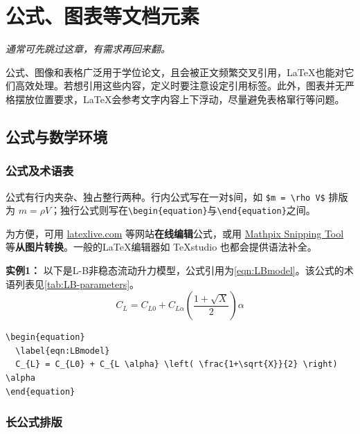 \chapter{公式、图表等文档元素}
\label{chap:example}

\textit{
通常可先跳过这章，有需求再回来翻。
}

公式、图像和表格广泛用于学位论文，且会被正文频繁交叉引用，\LaTeX{}也能对它们高效处理。若想引用这些内容，定义时要注意设定引用标签。此外，图表并无严格摆放位置要求，\LaTeX{}会参考文字内容上下浮动，尽量避免表格窜行等问题。

\section{公式与数学环境}

\subsection{公式及术语表}
\label{sec:eqn}

公式有行内夹杂、独占整行两种。行内公式写在一对\verb|$|间，如 \verb|$m = \rho V$| 排版为 $m = \rho V$；独行公式则写在\verb|\begin{equation}|与\verb|\end{equation}|之间。

为方便，可用 \href{https://www.latexlive.com/}{latexlive.com} 等网站\textbf{在线编辑}公式，或用 \href{https://mathpix.com/snipping-tool}{Mathpix Snipping Tool} 等\textbf{从图片转换}。一般的\LaTeX{}编辑器如 TeXstudio 也都会提供语法补全。

{\bf{实例1：}} 以下是L-B非稳态流动升力模型，公式引用为\autoref{eqn:LBmodel}。该公式的术语列表见\autoref{tab:LB-parameters}。
\begin{equation}
  \label{eqn:LBmodel}
  C_{L} = C_{L0} + C_{L \alpha} \left( \frac{1+\sqrt{X}}{2} \right) \alpha 
\end{equation}

\begin{lstlisting}[language={[LaTeX]TeX}, caption={L-B非稳态流动升力模型}]
\begin{equation}
  \label{eqn:LBmodel}
  C_{L} = C_{L0} + C_{L \alpha} \left( \frac{1+\sqrt{X}}{2} \right) \alpha 
\end{equation}
\end{lstlisting}

\subsection{长公式排版}


